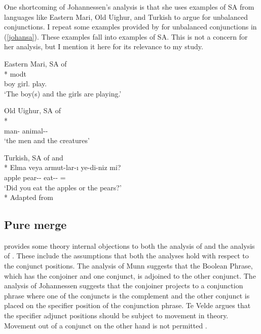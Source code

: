 One shortcoming of Johannessen's analysis is that she uses examples of SA from languages like Eastern Mari, Old Uighur, and Turkish to argue for unbalanced conjunctions. I repeat some examples provided by \citet{johannessen1998coordination} for unbalanced conjunctions in (\ref{johansa}). These examples fall into examples of SA. This is not a concern for her analysis, but I mention it here for its relevance to my study.

\begin{exe}
\ex \label{johansa}
\begin{xlist}
    \ex Eastern Mari, SA of {\Pl}\\* 
     mod\textschwa t \\ 
    boy {\And} girl.{\Pl} play.{\Tpl} \\
    \glt `The boy(s) and the girls are playing.'  
    
    \ex Old Uighur, SA of {\Acc}\\*
     \\ 
    man-{\Pl} animal-{\Pl}-{\Acc} \\
    \glt `the men and the creatures'
    
    \ex Turkish, SA of {\Pl} and {\Acc}\\*
    \gll Elma veya armut-lar-ı ye-di-niz mi? \\ 
    apple {\Or} pear-{\Pl}-{\Acc} eat-{\Pst}-{\Spl} ={\Q} \\
    \glt `Did you eat the apples or the pears?'\\*
    \hfill Adapted from \citet{johannessen1998coordination}
\end{xlist}

\end{exe}

\subsection{Pure merge}

\citet{te2005deriving} provides some theory internal objections to both the analysis of \citet{munn1993topics} and the analysis of \citet{johannessen1998coordination}. These include the assumptions that both the analyses hold with respect to the conjunct positions. The analysis of Munn suggests that the Boolean Phrase, which has the conjoiner and one conjunct, is adjoined to the other conjunct. The analysis of Johannessen suggests that the conjoiner projects to a conjunction phrase where one of the conjuncts is the complement and the other conjunct is placed on the specifier position of the conjunction phrase. Te Velde argues that the specifier adjunct positions should be subject to movement in theory. Movement out of a conjunct on the other hand is not permitted \citep{ross1967constraints}.  

